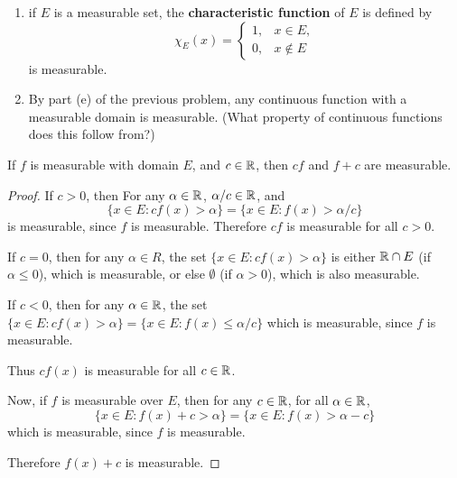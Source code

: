 \begin{ex}%
\begin{enumerate}
	\item if $E$ is a measurable set, the \textbf{characteristic function} 
	of $E$ is defined by 
	\begin{equation*}
		\chi_E (x) = 
	\left\{ \begin{matrix} 
		1, & x \in E, \\
		0, & x \notin E
	\end{matrix} \right.
	\end{equation*}
	is measurable. 
	\item By part (e) of the previous problem, any continuous function with a 
	measurable domain is measurable. (What property of continuous functions 
	does this follow from?) 
\end{enumerate}
\end{ex}

\begin{pblm}%
	If $f$ is measurable with domain $E$, and $c \in \mathbb{R}$, then $cf$ and 
	$f + c$ are measurable. 
\begin{proof}
	If $c > 0$, then For any $\alpha \in \mathbb{R}$, $\alpha /c \in \mathbb{R}$, and 
	\begin{equation*}
		\{x \in E: cf(x) > \alpha\} = \{x \in E: f(x) > \alpha/c\}
	\end{equation*}
	is measurable, since $f$ is measurable. Therefore $cf$ is measurable for all 
	$c > 0$. 

	If $c = 0$, then for any $\alpha \in R$, 
	the set $\{x \in E: cf(x) > \alpha\}$ is either $\mathbb{R}\cap E$ 
	(if $\alpha \le 0$), which is measurable, or else $\emptyset$ (if $\alpha > 0$), 
	which is also measurable. 

	If $c < 0$, then for any $\alpha \in \mathbb{R}$, the set $\{x \in E: cf(x) > \alpha\} = 
	\{x \in E: f(x) \le \alpha / c\}$ which is measurable, since $f$ is measurable. 

	Thus $cf(x)$ is measurable for all $c \in \mathbb{R}$.

	Now, if $f$ is measurable over $E$, then for any $c \in \mathbb{R}$, for all $\alpha \in \mathbb{R}$, 
	\begin{equation*}
		\{x \in E: f(x) + c > \alpha\} = \{x \in E: f(x) > \alpha - c\}
	\end{equation*}
	which is measurable, since $f$ is measurable. 

	Therefore $f(x) + c$ is measurable. 
\end{proof}
\end{pblm}

